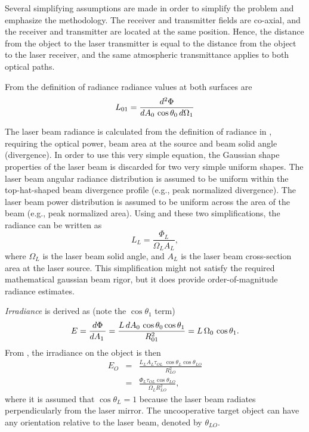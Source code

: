 Several simplifying assumptions are made in order to simplify the problem and emphasize the methodology. The receiver and transmitter fields are co-axial, and the receiver and transmitter are located at the same position. Hence, the distance from the object to the laser transmitter is equal to the distance from the object to the laser receiver, and the same atmospheric transmittance applies to both optical paths.

From the definition of radiance \cite{Willers2013} radiance values at both surfaces are
\begin{equation}
L_{01}=\frac{d^2 \Phi}{d{}A_0\,\cos\theta_0\,d\Omega_1}\label{cc1}
\end{equation}

The laser beam radiance is calculated from the definition of radiance in , requiring the optical power, beam area at the source and beam solid angle (divergence).  In order to use this very simple equation, the Gaussian shape properties of the laser beam is discarded for two very simple uniform shapes.
The laser beam angular radiance distribution is assumed to be uniform within the top-hat-shaped beam divergence profile (e.g., peak normalized divergence). The laser beam power distribution is assumed to be uniform across the area of the beam (e.g., peak normalized area). Using  and these two simplifications, the radiance can be written as
\begin{equation}
L_L=\frac{\Phi_L}{\Omega_L A_L},\label{fig:laserrangeirrad}
\end{equation}
where $\Omega_L$ is the laser beam solid angle, and $A_L$ is the laser beam cross-section area at the laser source. This simplification might not satisfy the required mathematical gaussian beam rigor, but it does provide order-of-magnitude radiance estimates.

\textit{Irradiance} is derived as (note the $\cos\theta_1$ term)
\begin{equation}
E=\frac{d{}\Phi}{d{}A_1\,}=
\frac{L\,d{}A_0\,\cos\theta_0\cos\theta_1}{R_{01}^2}=L\,\Omega_0\,\cos\theta_1.
\label{irradef}
\end{equation}
From , the irradiance on the object is then 
\begin{eqnarray}
E_O&=&\frac{L_L A_L \tau_{OL}\;\cos\theta_L\cos\theta_{LO}}{R^2_{LO}}\nonumber\\
&=&\frac{\Phi_L \tau_{OL}\cos\theta_{LO}}{\Omega_L R^2_{LO}},
\end{eqnarray}
where it is assumed that $\cos\theta_{L}=1$ because the laser beam radiates perpendicularly from the laser mirror. The uncooperative target object can have any orientation relative to the laser beam, denoted by $\theta_{LO}$.


